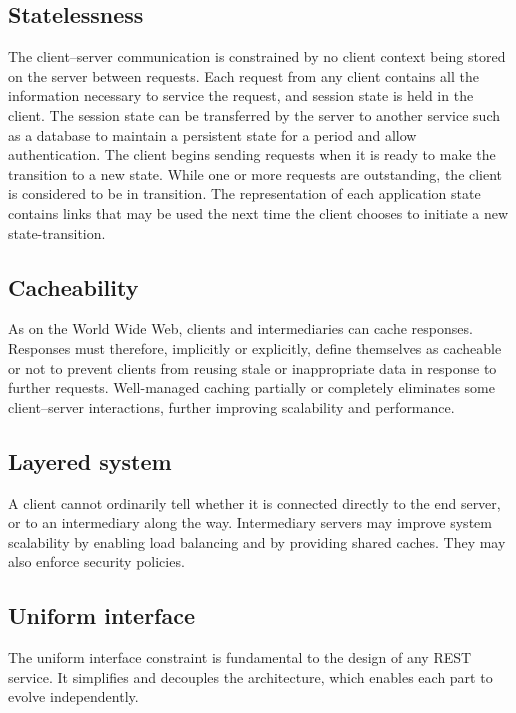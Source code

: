 \subsection{Statelessness}
The client–server communication is constrained by no client context being stored on the server between requests. Each request from any client contains all the information necessary to service the request, and session state is held in the client. The session state can be transferred by the server to another service such as a database to maintain a persistent state for a period and allow authentication. The client begins sending requests when it is ready to make the transition to a new state. While one or more requests are outstanding, the client is considered to be in transition. The representation of each application state contains links that may be used the next time the client chooses to initiate a new state-transition.

\subsection{Cacheability}
As on the World Wide Web, clients and intermediaries can cache responses. Responses must therefore, implicitly or explicitly, define themselves as cacheable or not to prevent clients from reusing stale or inappropriate data in response to further requests. Well-managed caching partially or completely eliminates some client–server interactions, further improving scalability and performance.

\subsection{Layered system}
A client cannot ordinarily tell whether it is connected directly to the end server, or to an intermediary along the way. Intermediary servers may improve system scalability by enabling load balancing and by providing shared caches. They may also enforce security policies.

\subsection{Uniform interface}
The uniform interface constraint is fundamental to the design of any REST service. It simplifies and decouples the architecture, which enables each part to evolve independently.





